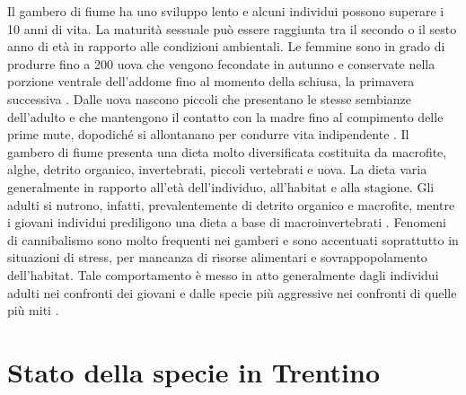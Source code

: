 \documentclass[10pt,twoside,openany,x11names,svgnames,italian,a5paper,dvipsnames,table]{memoir}
\newcommand\chapterillustration{}
\begin{document}
Il gambero di fiume ha uno sviluppo lento e alcuni individui possono superare i 10 anni di vita. La maturità sessuale può essere raggiunta tra il secondo o il sesto anno di età in rapporto alle condizioni ambientali. Le femmine sono in grado di produrre fino a 200 uova che vengono fecondate in autunno e conservate nella porzione ventrale dell’addome fino al momento della schiusa, la primavera successiva \cite{Abrahamsson}. Dalle uova nascono piccoli che presentano le stesse sembianze dell’adulto e che mantengono il contatto con la madre fino al compimento delle prime mute, dopodiché si allontanano per condurre vita indipendente \cite{Mazzoni}.
Il gambero di fiume presenta una dieta molto diversificata costituita da macrofite, alghe, detrito organico, invertebrati, piccoli vertebrati e uova. La dieta varia generalmente in rapporto all’età dell’individuo, all’habitat e alla stagione. Gli adulti si nutrono, infatti, prevalentemente di detrito organico e macrofite, mentre i giovani individui prediligono una dieta a base di macroinvertebrati \cite{Souty} \cite{Reynolds}. Fenomeni di cannibalismo sono molto frequenti nei gamberi e sono accentuati soprattutto in situazioni di stress, per mancanza di risorse alimentari e sovrappopolamento dell’habitat. Tale comportamento è messo in atto generalmente dagli individui adulti nei confronti dei giovani e dalle specie più aggressive nei confronti di quelle più miti \cite{Abrahamsson} \cite{Elgar}.

   
\chapter{Stato della specie in Trentino}
\renewcommand\chapterillustration{4.jpg}
\end{document}
